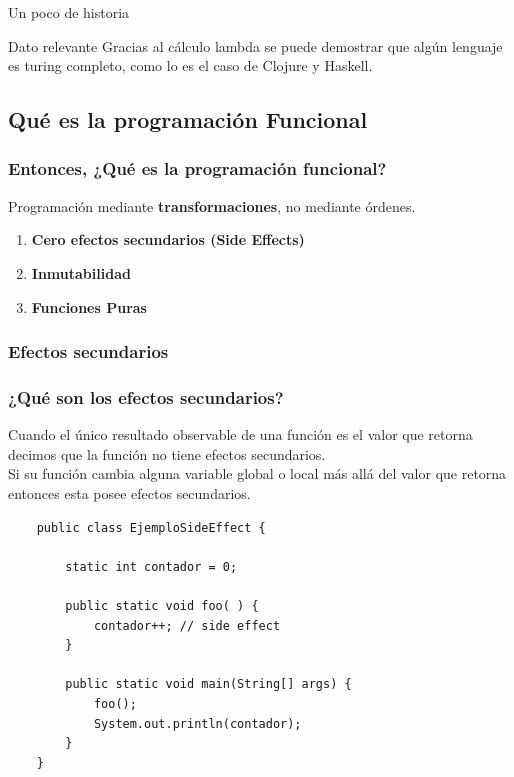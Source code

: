 \documentclass{beamer}
\begin{document}
\begin{frame}{Un poco de historia}

    \vspace{0.5cm}
    \begin{block}{Dato relevante}
        \scriptsize
        Gracias al cálculo lambda se puede demostrar que algún lenguaje es turing completo, como lo es el caso de Clojure y Haskell.
    \end{block}
\end{frame}

\subsection{Qué es la programación Funcional}
\begin{frame}[fragile]
    \frametitle{ Entonces, ¿Qué es la programación funcional? }
    \begin{center}
        Programación mediante \textbf{transformaciones}, no mediante órdenes.
    \end{center}
    \begin{enumerate}
        \item \textbf{Cero efectos secundarios (Side Effects) }
        \item \textbf{Inmutabilidad }
        \item \textbf{Funciones Puras }
    \end{enumerate}
\end{frame}

\subsubsection{Efectos secundarios}
\begin{frame}[fragile]
    \frametitle{ ¿Qué son los efectos secundarios? }
    Cuando el único resultado observable de una función es el valor que retorna decimos que la función no tiene efectos secundarios. \\
    Si su función cambia alguna variable global o local más allá del valor que retorna entonces esta posee efectos secundarios.
    \begin{lstlisting}
    public class EjemploSideEffect {

        static int contador = 0;

        public static void foo( ) {
            contador++; // side effect
        }

        public static void main(String[] args) {
            foo();
            System.out.println(contador);
        }
    }
    \end{lstlisting}
\end{frame}
\end{document}
